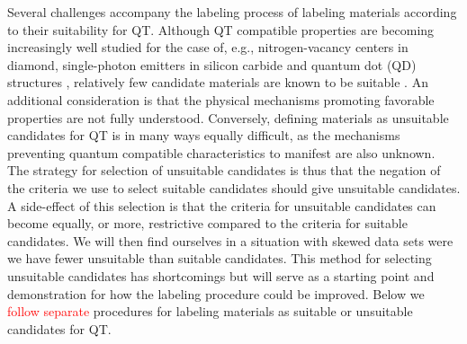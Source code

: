 \documentclass[superscriptaddress,unsortedaddress,
 amsmath,amssymb,
 aps,
]{revtex4-2}
\newcommand{\mrk}[1]{\textcolor{red}{#1}}
\begin{document}
Several challenges accompany the labeling process of labeling materials according to their suitability for QT. 
Although QT compatible properties are becoming increasingly well studied for the case of, e.g., nitrogen-vacancy centers in diamond, single-photon emitters in silicon carbide and quantum dot (QD) structures \cite{Doherty_2013,Bathen2021,Aharonovich_2016}, relatively few candidate materials are known to be suitable \cite{Atatuere2018,Zhang2020}. An additional consideration is that the physical mechanisms promoting favorable properties are not fully understood. 
Conversely, defining materials as unsuitable candidates for QT is in many ways equally difficult, as the mechanisms preventing quantum compatible characteristics to manifest are also unknown. 
The strategy for selection of unsuitable candidates is thus that the negation of the criteria we use to select suitable candidates should give unsuitable candidates.
A side-effect of this selection is that the criteria for unsuitable candidates can become equally, or more, restrictive compared to the criteria for suitable candidates. 
We will then find ourselves in a situation with skewed data sets were we have fewer unsuitable than suitable candidates. 
This method for selecting unsuitable candidates has shortcomings but will serve as a starting point and demonstration for how the labeling procedure could be improved. 
Below we \mrk{follow separate} procedures for labeling materials as suitable or unsuitable candidates for QT. 
\end{document}
